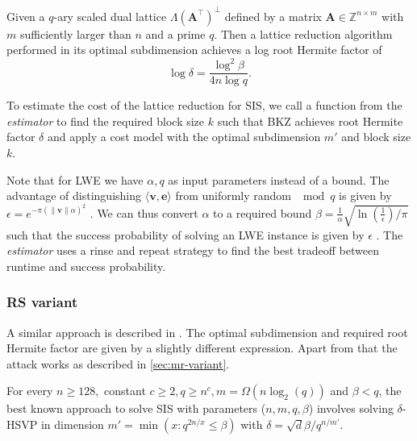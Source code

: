 \begin{theorem}
  Given a $q$-ary scaled dual lattice $\Lambda(\mathbf{A}^\intercal)^{\perp}$ defined by a matrix $\mathbf{A} \in \mathbb{Z}^{n \times m}$ with $m$ sufficiently larger than $n$ and a prime $q$. Then a lattice reduction algorithm performed in its optimal subdimension achieves a log root Hermite factor of
  \begin{equation}
    \log \delta = \frac{\log^2 \beta}{4n \log q}. \label{eq:mr-log-RHF}
  \end{equation}
\end{theorem}

To estimate the cost of the lattice reduction for SIS, we call a function from the \textit{estimator} to find the required block size $k$ such that BKZ achieves root Hermite factor $\delta$ and apply a cost model with the optimal subdimension $m'$ and block size $k$.

Note that for LWE we have $\alpha, q$ as input parameters instead of a bound. The advantage of distinguishing $\langle \mathbf{v}, \mathbf{e}\rangle$ from uniformly random $\mod q$ is given by  $\epsilon = e^{-\pi (\| \mathbf{v}\| \alpha)^2}$ \cite{LP11}. We can thus convert $\alpha$ to a required bound $\beta = \frac{1}{\alpha} \sqrt{\ln (\frac{1}{\epsilon})/ \pi}$ such that the success probability of solving an LWE instance is given by $\epsilon$ \cite[Corollary~2]{APS15}. The \textit{estimator} uses a rinse and repeat strategy to find the best tradeoff between runtime and success probability.






\subsubsection{RS variant \cite{RS10}}

A similar approach is described in \cite{RS10}. The optimal subdimension and required root Hermite factor are given by a slightly different expression. Apart from that the attack works as described in \cref{sec:mr-variant}.

\begin{theorem}
  For every $n \geq 128,$ constant $c \geq 2, q \geq n^c, m = \Omega(n \log_2(q))$ and $\beta < q$, the best known approach to solve SIS with parameters ($n, m, q, \beta$) involves solving $\delta$-HSVP in dimension $m' = \min(x : q^{2n/x} \leq \beta)$ with $\delta = \sqrt{d}{\beta / q^{n/m'}}$.
\end{theorem}

